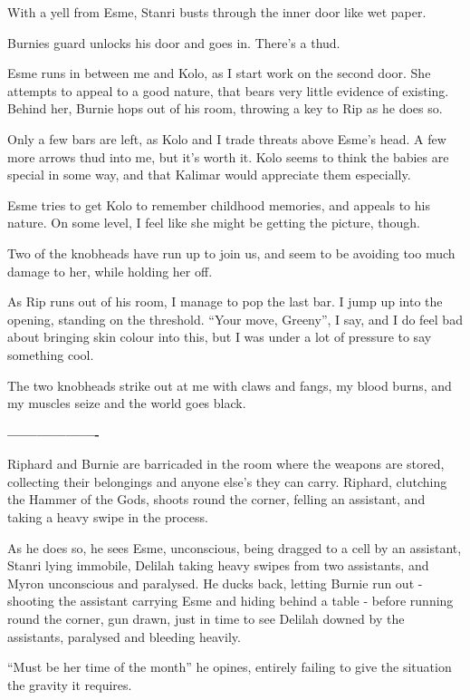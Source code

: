 With a yell from Esme, Stanri busts through the inner door like wet paper.\medskip

Burnies guard unlocks his door and goes in. There’s a thud.\medskip

Esme runs in between me and Kolo, as I start work on the second door. She attempts to appeal to a good nature, that bears very little evidence of existing. Behind her, Burnie hops out of his room, throwing a key to Rip as he does so.\medskip

Only a few bars are left, as Kolo and I trade threats above Esme’s head. A few more arrows thud into me, but it’s worth it. Kolo seems to think the babies are special in some way, and that Kalimar would appreciate them especially.\medskip

Esme tries to get Kolo to remember childhood memories, and appeals to his nature. On some level, I feel like she might be getting the picture, though.\medskip

Two of the knobheads have run up to join us, and seem to be avoiding too much damage to her, while holding her off.\medskip

As Rip runs out of his room, I manage to pop the last bar. I jump up into the opening, standing on the threshold. “Your move, Greeny”, I say, and I do feel bad about bringing skin colour into this, but I was under a lot of pressure to say something cool.\medskip

The two knobheads strike out at me with claws and fangs, my blood burns, and my muscles seize and the world goes black.\medskip

\textbf{-------------------}\medskip

Riphard and Burnie are barricaded in the room where the weapons are stored, collecting their belongings and anyone else’s they can carry. Riphard, clutching the Hammer of the Gods, shoots round the corner, felling an assistant, and taking a heavy swipe in the process.\medskip

As he does so, he sees Esme, unconscious, being dragged to a cell by an assistant, Stanri lying immobile, Delilah taking heavy swipes from two assistants, and Myron unconscious and paralysed. He ducks back, letting Burnie run out - shooting the assistant carrying Esme and hiding behind a table - before running round the corner, gun drawn, just in time to see Delilah downed by the assistants, paralysed and bleeding heavily.\medskip

“Must be her time of the month” he opines, entirely failing to give the situation the gravity it requires.\medskip

